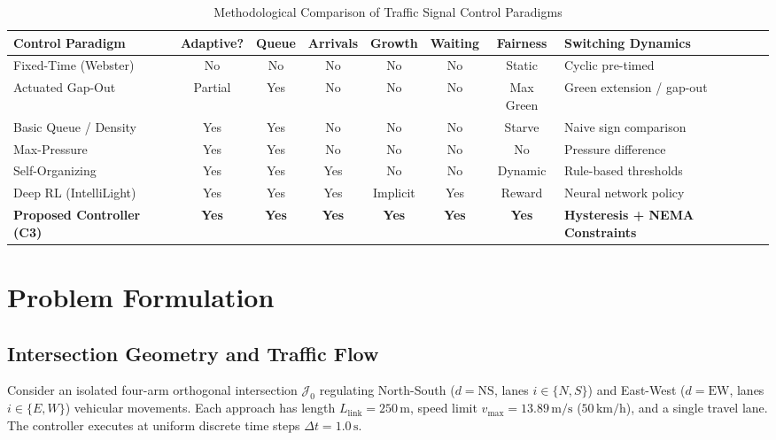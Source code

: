 \documentclass[11pt,journal,onecolumn]{article}
\begin{document}
\begin{table}[htbp]
\centering
\small
\caption{Methodological Comparison of Traffic Signal Control Paradigms}
\label{tab:lit_comparison}
\begin{tabularx}{\textwidth}{lccccccX}
\toprule
\textbf{Control Paradigm} & \textbf{Adaptive?} & \textbf{Queue} & \textbf{Arrivals} & \textbf{Growth} & \textbf{Waiting} & \textbf{Fairness} & \textbf{Switching Dynamics} \\
\midrule
Fixed-Time (Webster) \cite{webster1958traffic} & No & No & No & No & No & Static & Cyclic pre-timed \\
Actuated Gap-Out \cite{nema2005ts2} & Partial & Yes & No & No & No & Max Green & Green extension / gap-out \\
Basic Queue / Density \cite{miller1963computer} & Yes & Yes & No & No & No & Starve & Naive sign comparison \\
Max-Pressure \cite{varaiya2013max} & Yes & Yes & No & No & No & No & Pressure difference \\
Self-Organizing \cite{cools2013self} & Yes & Yes & Yes & No & No & Dynamic & Rule-based thresholds \\
Deep RL (IntelliLight) \cite{wei2018intellilight} & Yes & Yes & Yes & Implicit & Yes & Reward & Neural network policy \\
\textbf{Proposed Controller (C3)} & \textbf{Yes} & \textbf{Yes} & \textbf{Yes} & \textbf{Yes} & \textbf{Yes} & \textbf{Yes} & \textbf{Hysteresis + NEMA Constraints} \\
\bottomrule
\end{tabularx}
\end{table}

\section{Problem Formulation}
\subsection{Intersection Geometry and Traffic Flow}
Consider an isolated four-arm orthogonal intersection $\mathcal{J}_0$ regulating North-South ($d=\text{NS}$, lanes $i \in \{N, S\}$) and East-West ($d=\text{EW}$, lanes $i \in \{E, W\}$) vehicular movements. Each approach has length $L_{\text{link}} = 250\,\text{m}$, speed limit $v_{\text{max}} = 13.89\,\text{m/s}$ ($50\,\text{km/h}$), and a single travel lane. The controller executes at uniform discrete time steps $\Delta t = 1.0\,\text{s}$.
\end{document}
